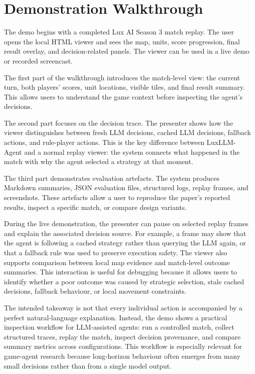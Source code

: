 \documentclass[11pt]{article}
\begin{document}
\section{Demonstration Walkthrough}

The demo begins with a completed Lux AI Season 3 match replay. The user opens the local HTML viewer and sees the map, units, score progression, final result overlay, and decision-related panels. The viewer can be used in a live demo or recorded screencast.

The first part of the walkthrough introduces the match-level view: the current turn, both players' scores, unit locations, visible tiles, and final result summary. This allows users to understand the game context before inspecting the agent's decisions.

The second part focuses on the decision trace. The presenter shows how the viewer distinguishes between fresh LLM decisions, cached LLM decisions, fallback actions, and rule-player actions. This is the key difference between LuxLLM-Agent and a normal replay viewer: the system connects what happened in the match with why the agent selected a strategy at that moment.

The third part demonstrates evaluation artefacts. The system produces Markdown summaries, JSON evaluation files, structured logs, replay frames, and screenshots. These artefacts allow a user to reproduce the paper's reported results, inspect a specific match, or compare design variants.

During the live demonstration, the presenter can pause on selected replay frames and explain the associated decision source. For example, a frame may show that the agent is following a cached strategy rather than querying the LLM again, or that a fallback rule was used to preserve execution safety. The viewer also supports comparison between local map evidence and match-level outcome summaries. This interaction is useful for debugging because it allows users to identify whether a poor outcome was caused by strategic selection, stale cached decisions, fallback behaviour, or local movement constraints.

The intended takeaway is not that every individual action is accompanied by a perfect natural-language explanation. Instead, the demo shows a practical inspection workflow for LLM-assisted agents: run a controlled match, collect structured traces, replay the match, inspect decision provenance, and compare summary metrics across configurations. This workflow is especially relevant for game-agent research because long-horizon behaviour often emerges from many small decisions rather than from a single model output.
\end{document}
